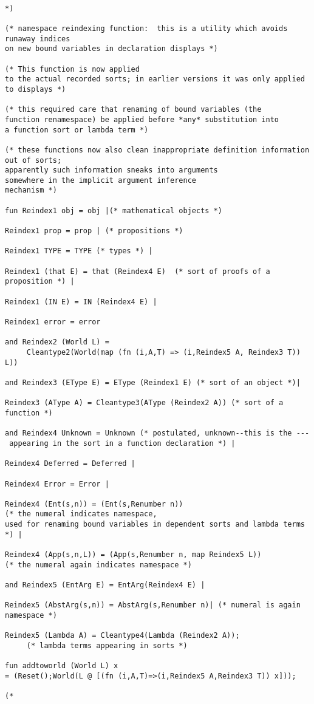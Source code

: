 \documentclass{article}
\begin{document}
\begin{verbatim}

*)

(* namespace reindexing function:  this is a utility which avoids runaway indices
on new bound variables in declaration displays *)

(* This function is now applied
to the actual recorded sorts; in earlier versions it was only applied to displays *)

(* this required care that renaming of bound variables (the
function renamespace) be applied before *any* substitution into
a function sort or lambda term *)

(* these functions now also clean inappropriate definition information out of sorts;
apparently such information sneaks into arguments 
somewhere in the implicit argument inference
mechanism *)

fun Reindex1 obj = obj |(* mathematical objects *) 

Reindex1 prop = prop | (* propositions *) 

Reindex1 TYPE = TYPE (* types *) |

Reindex1 (that E) = that (Reindex4 E)  (* sort of proofs of a proposition *) |

Reindex1 (IN E) = IN (Reindex4 E) |

Reindex1 error = error

and Reindex2 (World L) = 
     Cleantype2(World(map (fn (i,A,T) => (i,Reindex5 A, Reindex3 T)) L))

and Reindex3 (EType E) = EType (Reindex1 E) (* sort of an object *)|

Reindex3 (AType A) = Cleantype3(AType (Reindex2 A)) (* sort of a function *)

and Reindex4 Unknown = Unknown (* postulated, unknown--this is the ---
 appearing in the sort in a function declaration *) |

Reindex4 Deferred = Deferred |

Reindex4 Error = Error |

Reindex4 (Ent(s,n)) = (Ent(s,Renumber n)) 
(* the numeral indicates namespace, 
used for renaming bound variables in dependent sorts and lambda terms *) |

Reindex4 (App(s,n,L)) = (App(s,Renumber n, map Reindex5 L)) 
(* the numeral again indicates namespace *)

and Reindex5 (EntArg E) = EntArg(Reindex4 E) |

Reindex5 (AbstArg(s,n)) = AbstArg(s,Renumber n)| (* numeral is again namespace *)

Reindex5 (Lambda A) = Cleantype4(Lambda (Reindex2 A));  
     (* lambda terms appearing in sorts *)

fun addtoworld (World L) x 
= (Reset();World(L @ [(fn (i,A,T)=>(i,Reindex5 A,Reindex3 T)) x]));

(*

\end{verbatim}
\end{document}
